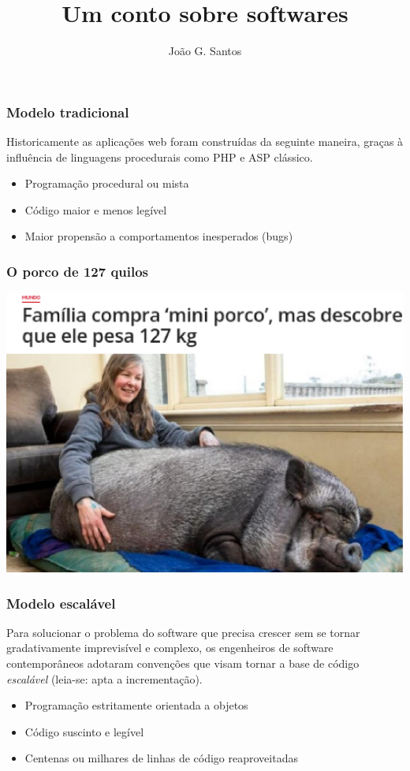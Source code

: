 \documentclass{beamer}
\title{Um conto sobre softwares}
\author{João G. Santos}
\begin{document}
\maketitle

\begin{frame}
  \frametitle{Modelo tradicional}
  Historicamente as aplicações web foram construídas da seguinte maneira, graças à influência de linguagens procedurais como PHP e ASP clássico.

  \vspace{1.5\baselineskip}
  \begin{itemize}
    \item Programação procedural ou mista
    \item Código maior e menos legível
    \item Maior propensão a comportamentos inesperados (bugs)
  \end{itemize}
\end{frame}

\begin{frame}
  \frametitle{O porco de 127 quilos}
  \begin{center}
    \includegraphics[width=\linewidth-12ex]{porco.eps}
  \end{center}
\end{frame}

\begin{frame}
  \frametitle{Modelo escalável}
  Para solucionar o problema do software que precisa crescer sem se tornar gradativamente imprevisível e complexo, os engenheiros de software contemporâneos adotaram convenções que visam tornar a base de código \textit{escalável} (leia-se: apta a incrementação).

  \vspace{1.5\baselineskip}
  \begin{itemize}
    \item Programação estritamente orientada a objetos
    \item Código suscinto e legível
    \item Centenas ou milhares de linhas de código reaproveitadas
  \end{itemize}
\end{frame}
\end{document}

